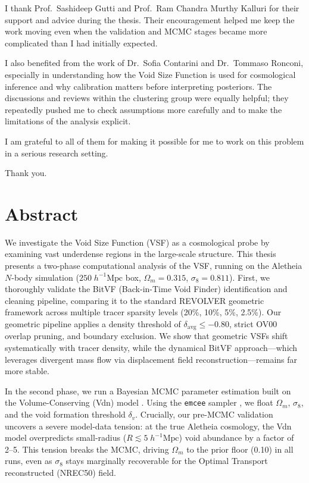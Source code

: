 \documentclass[12pt]{report}
\begin{document}
I thank Prof.\ Sashideep Gutti and Prof.\ Ram Chandra Murthy Kalluri for their support and advice during the thesis. Their encouragement helped me keep the work moving even when the validation and MCMC stages became more complicated than I had initially expected.

I also benefited from the work of Dr.\ Sofia Contarini and Dr.\ Tommaso Ronconi, especially in understanding how the Void Size Function is used for cosmological inference and why calibration matters before interpreting posteriors. The discussions and reviews within the clustering group were equally helpful; they repeatedly pushed me to check assumptions more carefully and to make the limitations of the analysis explicit.

I am grateful to all of them for making it possible for me to work on this problem in a serious research setting.

\bigskip\noindent Thank you.

\tableofcontents
\hypersetup{pageanchor=true}
\clearpage

\chapter*{Abstract}

We investigate the Void Size Function (VSF) as a cosmological probe by examining vast underdense regions in the large-scale structure. This thesis presents a two-phase computational analysis of the VSF, running on the Aletheia $N$-body simulation ($250\;h^{-1}\mathrm{Mpc}$ box, $\Omega_m=0.315$, $\sigma_8=0.811$). First, we thoroughly validate the BitVF (Back-in-Time Void Finder) identification and cleaning pipeline, comparing it to the standard REVOLVER geometric framework across multiple tracer sparsity levels (20\%, 10\%, 5\%, 2.5\%). Our geometric pipeline applies a density threshold of $\delta_\mathrm{avg} \leq -0.80$, strict OV00 overlap pruning, and boundary exclusion. We show that geometric VSFs shift systematically with tracer density, while the dynamical BitVF approach---which leverages divergent mass flow via displacement field reconstruction---remains far more stable.

In the second phase, we run a Bayesian MCMC parameter estimation built on the Volume-Conserving (Vdn) model \citep{Sheth2004,Jennings2013}. Using the \texttt{emcee} sampler \citep{ForemanMackey2013}, we float $\Omega_m$, $\sigma_8$, and the void formation threshold $\delta_v$. Crucially, our pre-MCMC validation uncovers a severe model-data tension: at the true Aletheia cosmology, the Vdn model overpredicts small-radius ($R \lesssim 5\;h^{-1}\mathrm{Mpc}$) void abundance by a factor of 2--5. This tension breaks the MCMC, driving $\Omega_m$ to the prior floor (0.10) in all runs, even as $\sigma_8$ stays marginally recoverable for the Optimal Transport reconstructed (NREC50) field. 
\end{document}
